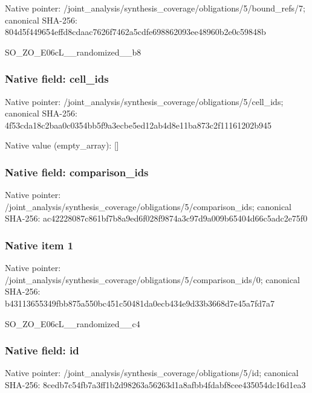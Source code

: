 \documentclass[10pt,a4paper]{article}
\begin{document}
Native pointer: /joint\_analysis/synthesi\allowbreak{}s\_coverage/obligations/5\allowbreak{}/bound\_refs/7; canonical SHA-256: 804d5f449654effd8cdaac76\allowbreak{}26f7462a5cdfe698862093ee\allowbreak{}48960b2e0c59848b


SO\_ZO\_E06cL\_\_randomized\_\_b8


\subsubsection{Native field: cell\_ids}


Native pointer: /joint\_analysis/synthesi\allowbreak{}s\_coverage/obligations/5\allowbreak{}/cell\_ids; canonical SHA-256: 4f53cda18c2baa0c0354bb5f\allowbreak{}9a3ecbe5ed12ab4d8e11ba87\allowbreak{}3c2f11161202b945



Native value (empty\_array): []



\subsubsection{Native field: comparison\_ids}


Native pointer: /joint\_analysis/synthesi\allowbreak{}s\_coverage/obligations/5\allowbreak{}/comparison\_ids; canonical SHA-256: ac42228087c861bf7b8a9ed6\allowbreak{}f028f9874a3c97d9a009b654\allowbreak{}04d66c5adc2e75f0



\subsubsection{Native item 1}


Native pointer: /joint\_analysis/synthesi\allowbreak{}s\_coverage/obligations/5\allowbreak{}/comparison\_ids/0; canonical SHA-256: b43113655349fbb875a550bc\allowbreak{}451c50481da0ecb434e9d33b\allowbreak{}3668d7e45a7fd7a7


SO\_ZO\_E06cL\_\_randomized\_\_c4


\subsubsection{Native field: id}


Native pointer: /joint\_analysis/synthesi\allowbreak{}s\_coverage/obligations/5\allowbreak{}/id; canonical SHA-256: 8cedb7c54fb7a3ff1b2d9826\allowbreak{}3a56263d1a8afbb4fdabf8ce\allowbreak{}e435054dc16d1ea3
\end{document}
